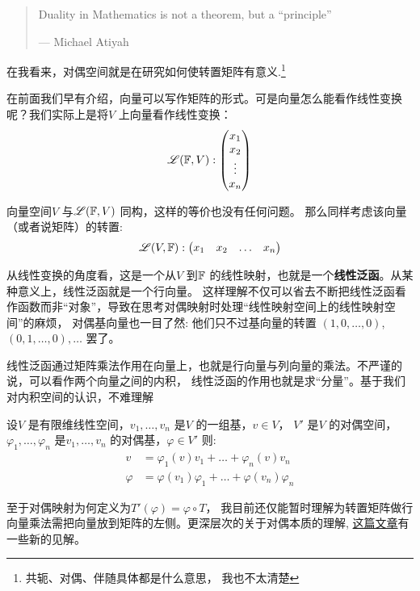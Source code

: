 \begin{quote}
    Duality in Mathematics is not a theorem, but a ``principle''

    \hfill --- Michael Atiyah
\end{quote}

在我看来，对偶空间就是在研究如何使转置矩阵有意义.\footnote{共轭、对偶、伴随具体都是什么意思，
我也不太清楚}

在前面我们早有介绍，向量可以写作矩阵的形式。可是向量怎么能看作线性变换呢？我们实际上是将\(V\)
上向量看作线性变换：\[
    \mathscr{L}(\mathbb{F},V):
    \begin{pmatrix}
        x_1 \\
        x_2 \\
        \vdots \\
        x_n
    \end{pmatrix}
\]

向量空间\(V\) 与\(\mathscr{L}(\mathbb{F},V)\) 同构，这样的等价也没有任何问题。
那么同样考虑该向量（或者说矩阵）的转置:
\[
    \mathscr{L}(V,\mathbb{F}):
    \begin{pmatrix}
        x_1 & x_2 & \dots & x_n
    \end{pmatrix}
\]

从线性变换的角度看，这是一个从\(V\) 到\(\mathbb{F}\)
的线性映射，也就是一个\textbf{线性泛函}。从某种意义上，线性泛函就是一个行向量。
这样理解不仅可以省去不断把线性泛函看作函数而非``对象''，导致在思考对偶映射时处理``线性映射空间上的线性映射空间''的麻烦，
对偶基向量也一目了然:
他们只不过基向量的转置 \((1,0,\dots ,0)\),\((0,1,\dots ,0),\dots \) 罢了。

线性泛函通过矩阵乘法作用在向量上，也就是行向量与列向量的乘法。不严谨的说，可以看作两个向量之间的内积，
线性泛函的作用也就是求``分量''。基于我们对内积空间的认识，不难理解
\begin{theorem}
    设\(V\) 是有限维线性空间，\(v_{1}, \dots ,v_{n}\) 是\(V\) 的一组基，\(v \in V\)，
    \(V'\) 是\(V\) 的对偶空间，\(\varphi_{1}, \dots ,\varphi_{n}\)
    是\(v_{1}, \dots ,v_{n}\) 的对偶基，\(\varphi \in V'\)
    则:
    \begin{align*}
        v &= \varphi_{1}(v)v_{1} + \dots + \varphi_{n}(v)v_{n} \\
        \varphi &= \varphi(v_{1})\varphi_{1} + \dots +
        \varphi(v_{n})\varphi_{n}
    \end{align*}
\end{theorem}

至于对偶映射为何定义为\(T'(\varphi)=\varphi \circ T\)，
我目前还仅能暂时理解为转置矩阵做行向量乘法需把向量放到矩阵的左侧。更深层次的关于对偶本质的理解,
\href{https://www.zhihu.com/question/38464481/answer/2110009942}{这篇文章}有一些新的见解。

